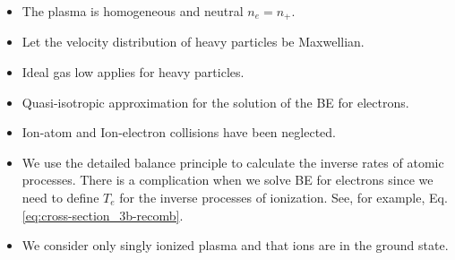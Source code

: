 \begin{itemize}[noitemsep,topsep=1pt,parsep=1pt,partopsep=3pt]
    \item The plasma is homogeneous and neutral $n_e = n_{+}$.
    \item Let the velocity distribution of heavy particles be Maxwellian. 
    \item Ideal gas low applies for heavy particles. 
    \item Quasi-isotropic approximation for the solution of the BE for electrons.
    \item Ion-atom and Ion-electron collisions have been neglected.  
    \item We use the detailed balance principle to calculate the inverse rates of atomic processes. There is a complication when we solve BE for electrons since we need to define $T_e$ for the inverse processes of ionization. See, for example, Eq. \eqref{eq:cross-section_3b-recomb}.
    \item We consider only singly ionized plasma and that ions are in the ground state. 


    
\end{itemize}


